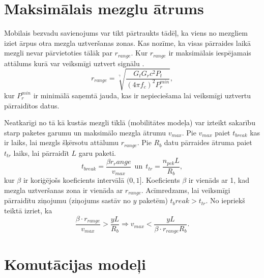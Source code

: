 \section{Maksimālais mezglu ātrums}
Mobilais bezvadu savienojums var tikt pārtraukts tādēļ, ka viens no mezgliem iziet ārpus otra mezgla uztveršanas zonas. Kas nozīme, ka visas pārraides laikā mezgli nevar pārvietoties tālāk par $r_{range}$. Kur $r_{range}$ ir maksimālais iespējamais attālums kurā var veiksmīgi uztvert signālu \cite{qoS_static}.
\begin{equation}
r_{range}=\sqrt[\gamma]{\frac{G_{t}G_{r}c^2 P_{t}}{(4\pi f_{c})^2 P_{r}^{min}}},
\label{eq:r_range}
\end{equation}
kur $P_{r}^{min}$ ir minimālā saņemtā jauda, kas ir nepieciešama lai veiksmīgi uztvertu pārraidītos datus.

Neatkarīgi no tā kā kustās mezgli tīklā (mobilitātes modeļa) var izteikt sakarību starp paketes garumu un maksimālo mezgla ātrumu $v_{max}$. Pie $v_{max}$ paiet $t_{break}$  kas ir laiks, lai mezgls šķērsotu attālumu $r_{range}$. Pie $R_{b}$ datu pārraides ātruma paiet $t_{tr}$ laiks, lai pārraidīt $L$ garu paketi.
\begin{equation}
t_{break}=\frac{\beta r_range}{v_{max}} ~~\mbox{un}~~ t_{tr}=\frac{n_{pck}L}{R_{b}},
\end{equation}
kur $\beta$ ir koriģējošs koeficients intervālā $(0, 1]$. Koeficients $\beta$ ir vienāds ar 1, kad mezgla uztveršanas zona ir vienāda ar $r_{range}$. Acīmredzams,  lai veiksmīgi pārraidītu ziņojumu (ziņojums sastāv no $y$ paketēm) $t_break > t_{tr}$. No iepriekš teiktā izriet, ka
\begin{equation}
\frac{\beta\cdot r_{range}}{v_{max}}>\frac{yL}{R_{b}}  \Rightarrow  v_{max}<\frac{yL}{\beta\cdot r_{range}R_{b}}.
\end{equation}

\section{Komutācijas modeļi}\label{sec:switch}
